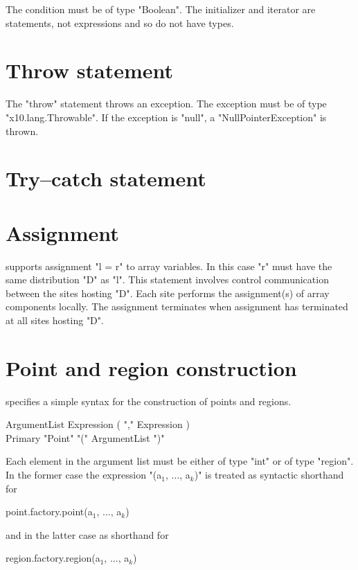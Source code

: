 The condition must be of type \xcd"Boolean".
The initializer and iterator are statements, not expressions
and so do not have types.

\section{Throw statement}

The \xcd"throw" statement throws an exception.  The exception
must be of type \xcd"x10.lang.Throwable".  If the exception is
\xcd"null", a \xcd"NullPointerException" is thrown.

\section{Try--catch statement}




\section{Assignment}\label{AssignmentStatement}

%

{}\Xten{} supports assignment \xcd"l = r" to array variables. In this
case \xcd"r" must have the same distribution \xcd"D" as \xcd"l". This
statement involves control communication between the sites hosting
\xcd"D". Each site performs the assignment(s) of array components
locally. The assignment terminates when assignment has terminated at
all sites hosting \xcd"D".


\section{Point and region construction}\label{point-syntax}
\Xten{} specifies a simple syntax for the construction of points and regions.
\begin{grammar}
ArgumentList \: Expression ( \xcd"," Expression )\star \\
Primary \: \xcd"Point" \xcd"(" ArgumentList \xcd")"
\end{grammar}
Each element in the argument list must be either of type \xcd"int" or 
of type \xcd"region". In the former case the expression 
\xcdmath"(a$_1$, $\dots$, a$_k$)" is treated as syntactic shorthand for
\begin{xtenmath}
point.factory.point(a$_1$, $\dots$, a$_k$)
\end{xtenmath}
\noindent and in the latter case as shorthand for
\begin{xten}
region.factory.region(a$_1$, $\dots$, a$_k$)
\end{xten}

